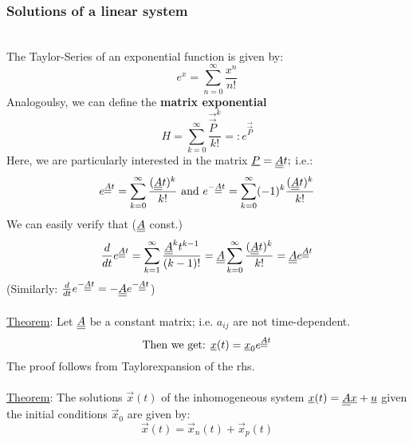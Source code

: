 \subsubsection{Solutions of a linear system}
\underline{}\vspace{0.2 cm}\\
The Taylor-Series of an exponential function is given by:
\begin{equation*}
	e^x=\sum\limits_{n=0}^\infty \frac{x^n}{n!}
\end{equation*}
Analogoulsy, we can define the \textbf{matrix exponential}
\begin{equation*}
	H=\sum\limits_{k=0}^\infty \frac{\vec{\vec{P}}^k}{k!}=:e^{\vec{\vec{P}}}
\end{equation*}
Here, we are particularly interested in the matrix $\underline{\smash{\underline{\smash{P}}}}=\underline{\underline{A}}t;$ i.e.:
\begin{equation*}
	e^{\underline{\underline{A}}t}=\sum\limits_{k=0}^\infty \frac{(\underline{\underline{A}}t)^k}{k!} \text{ and } e^{-\underline{\underline{A}}t}=\sum\limits_{k=0}^\infty (-1)^k\frac{(\underline{\underline{A}}t)^k}{k!}
\end{equation*}
We can easily verify that ($\underline{\underline{A}}$ const.)
\begin{equation*}
	\frac{d}{dt}e^{\underline{\underline{A}}t}=\sum\limits_{k=1}^\infty \frac{\underline{\underline{A}}^kt^{k-1}}{(k-1)!}=\underline{\underline{A}}\sum\limits_{k=0}^\infty \frac{(\underline{\underline{A}}t)^k}{k!}=\underline{\underline{A}}e^{\underline{\underline{A}}t}
\end{equation*}
(Similarly: $\frac{d}{dt}e^{-\underline{\underline{A}}t}=-\underline{\underline{A}}e^{-\underline{\underline{A}}t}$)\vspace{0.5 cm}\\
\underline{}\vspace{0.2 cm}\\
\underline{Theorem}: Let $\underline{\underline{A}}$ be a constant matrix; i.e. $a_{ij}$ are not time-dependent.
\begin{equation*}
	\text{Then we get: } \underline{\smash{x}}(t)=\underline{\smash{x}}_0e^{\underline{\underline{A}}t}
\end{equation*}
The proof follows from Taylorexpansion of the rhs.\\
\underline{}\\
\underline{Theorem}: The solutions $\vec{x}(t)$ of the inhomogeneous system $\underline{\smash{x}}(t)=\underline{\underline{A}}\underline{\smash{x}}+\underline{\smash{u}}$ given the initial conditions $\vec{x}_0$ are given by:
\begin{equation*}
	\vec{x}(t)=\vec{x}_n(t)+\vec{x}_p(t)
\end{equation*}
